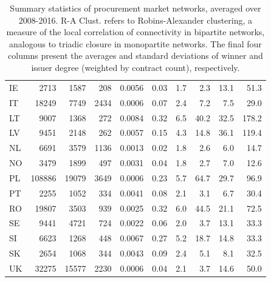 \begin{landscape}
\begin{table}[t]
\begin{tabular}{lrrrrrrrrr}
IE      &        2713 &      1587 &       208 &   0.0056 &    0.03 &             1.7 &             2.3 &            13.1 &            51.3 \\
IT      &       18249 &      7749 &      2434 &   0.0006 &    0.07 &             2.4 &             7.2 &             7.5 &            29.0 \\
LT      &        9007 &      1368 &       272 &   0.0084 &    0.32 &             6.5 &            40.2 &            32.5 &           178.2 \\
LV      &        9451 &      2148 &       262 &   0.0057 &    0.15 &             4.3 &            14.8 &            36.1 &           119.4 \\
NL      &        6691 &      3579 &      1136 &   0.0013 &    0.02 &             1.8 &             2.6 &             6.0 &            14.7 \\
NO      &        3479 &      1899 &       497 &   0.0031 &    0.04 &             1.8 &             2.7 &             7.0 &            12.6 \\
PL      &      108886 &     19079 &      3649 &   0.0006 &    0.23 &             5.7 &            64.7 &            29.7 &            96.9 \\
PT      &        2255 &      1052 &       334 &   0.0041 &    0.08 &             2.1 &             3.1 &             6.7 &            30.4 \\
RO      &       19807 &      3503 &       939 &   0.0025 &    0.32 &             6.0 &            44.5 &            21.1 &            72.5 \\
SE      &        9441 &      4721 &       724 &   0.0022 &    0.06 &             2.0 &             3.7 &            13.1 &            33.3 \\
SI      &        6623 &      1268 &       448 &   0.0067 &    0.27 &             5.2 &            18.7 &            14.8 &            33.3 \\
SK      &        2654 &      1068 &       344 &   0.0043 &    0.09 &             2.4 &             5.1 &             8.1 &            32.5 \\
UK      &       32275 &     15577 &      2230 &   0.0006 &    0.04 &             2.1 &             3.7 &            14.6 &            50.0 \\
\bottomrule
\end{tabular}
\caption[Procurement Market Network Summary Statistics]{Summary statistics of procurement market networks, averaged over 2008-2016. R-A Clust. refers to Robins-Alexander clustering, a measure of the local correlation of connectivity in bipartite networks, analogous to triadic closure in monopartite networks. The final four columns present the averages and standard deviations of winner and issuer degree (weighted by contract count), respectively.}
\label{tab:network_summary}
\end{table}
\end{landscape}

